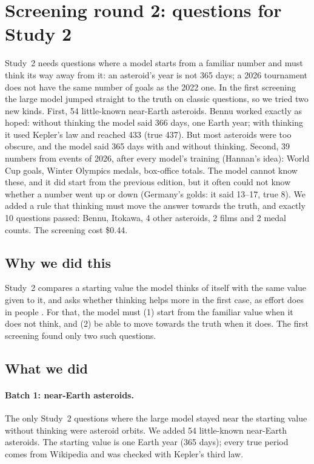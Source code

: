 \documentclass[11pt,a4paper]{article}
\begin{document}
\section{Screening round 2: questions for Study 2}
\label{sec:e4}

\begin{inshort}
Study~2 needs questions where a model starts from a familiar number and must think its way away from it: an asteroid's year is not 365 days; a 2026 tournament does not have the same number of goals as the 2022 one. In the first screening the large model jumped straight to the truth on classic questions, so we tried two new kinds. First, 54 little-known near-Earth asteroids. Bennu worked exactly as hoped: without thinking the model said 366 days, one Earth year; with thinking it used Kepler's law and reached 433 (true 437). But most asteroids were too obscure, and the model said 365 days with and without thinking. Second, 39 numbers from events of 2026, after every model's training (Hannan's idea): World Cup goals, Winter Olympics medals, box-office totals. The model cannot know these, and it did start from the previous edition, but it often could not know whether a number went up or down (Germany's golds: it said 13--17, true 8). We added a rule that thinking must move the answer towards the truth, and exactly 10 questions passed: Bennu, Itokawa, 4 other asteroids, 2 films and 2 medal counts. The screening cost \$0.44.
\end{inshort}

\subsection{Why we did this}
Study~2 compares a starting value the model thinks of itself with the same value given to it, and asks whether thinking helps more in the first case, as effort does in people \citep{epley2001putting,epley2005effortful}. For that, the model must (1) start from the familiar value when it does not think, and (2) be able to move towards the truth when it does. The first screening found only two such questions.

\subsection{What we did}
\paragraph{Batch 1: near-Earth asteroids.} The only Study~2 questions where the large model stayed near the starting value without thinking were asteroid orbits. We added 54 little-known near-Earth asteroids. The starting value is one Earth year (365 days); every true period comes from Wikipedia and was checked with Kepler's third law.
\end{document}
